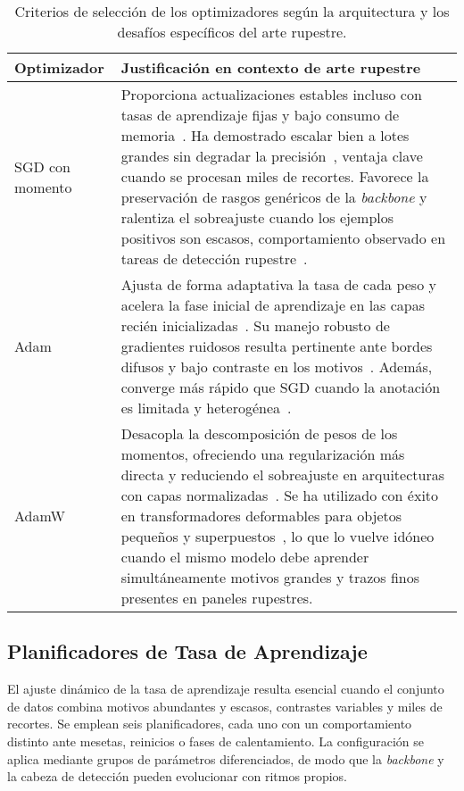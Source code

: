 \begin{table}[!h]
    \centering
    \begin{tabular}{p{3.2cm} p{10.5cm}}
        \hline
        \textbf{Optimizador} & \textbf{Justificación en contexto de arte rupestre} \\
        \hline
        SGD con momento &
        Proporciona actualizaciones estables incluso con tasas de aprendizaje fijas y bajo consumo de memoria~\cite{robbins1951stochastic,qian1999momentum}.
        Ha demostrado escalar bien a lotes grandes sin degradar la precisión~\cite{goyal2017}, ventaja clave cuando se procesan miles de recortes.
        Favorece la preservación de rasgos genéricos de la \emph{backbone} y ralentiza el sobreajuste cuando los ejemplos positivos son escasos, comportamiento observado en tareas de detección rupestre~\cite{suhaimi2023}. \\[0.3em]

        Adam &
        Ajusta de forma adaptativa la tasa de cada peso y acelera la fase inicial de aprendizaje en las capas recién inicializadas~\cite{kingma2015adam}.
        Su manejo robusto de gradientes ruidosos resulta pertinente ante bordes difusos y bajo contraste en los motivos~\cite{horn2022ai,jalandoni2022}.
        Además, converge más rápido que SGD cuando la anotación es limitada y heterogénea~\cite{goodfellow2016deep}. \\[0.3em]

        AdamW &
        Desacopla la descomposición de pesos de los momentos, ofreciendo una regularización más directa y reduciendo el sobreajuste en arquitecturas con capas normalizadas~\cite{loshchilov2019adamw}.
        Se ha utilizado con éxito en transformadores deformables para objetos pequeños y superpuestos~\cite{zhu2021,smallobjDETR}, lo que lo vuelve idóneo cuando el mismo modelo debe aprender simultáneamente motivos grandes y trazos finos presentes en paneles rupestres. \\
    \end{tabular}
    \caption{Criterios de selección de los optimizadores según la arquitectura y los desafíos específicos del arte rupestre.}
    \label{tab:optimizadores}
\end{table}


\subsection{Planificadores de Tasa de Aprendizaje}

El ajuste dinámico de la tasa de aprendizaje resulta esencial cuando el conjunto de datos combina motivos abundantes y escasos, contrastes variables y miles de recortes.
Se emplean seis planificadores, cada uno con un comportamiento distinto ante mesetas, reinicios o fases de calentamiento.
La configuración se aplica mediante grupos de parámetros diferenciados, de modo que la \emph{backbone} y la cabeza de detección pueden evolucionar con ritmos propios.

